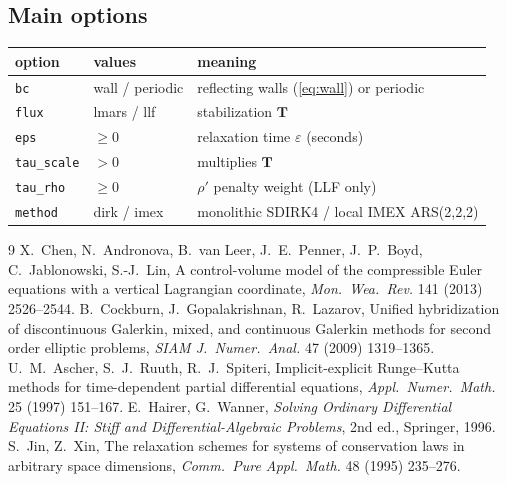 \documentclass[11pt,a4paper]{article}
\begin{document}
\subsection{Main options}
\begin{tabular}{lll}\toprule
option & values & meaning\\\midrule
\texttt{bc} & wall / periodic & reflecting walls (\eqref{eq:wall}) or periodic\\
\texttt{flux} & lmars / llf & stabilization $\bm T$\\
\texttt{eps} & $\ge 0$ & relaxation time $\varepsilon$ (seconds)\\
\texttt{tau\_scale} & $>0$ & multiplies $\bm T$\\
\texttt{tau\_rho} & $\ge0$ & $\rho'$ penalty weight (LLF only)\\
\texttt{method} & dirk / imex & monolithic SDIRK4 / local IMEX ARS(2,2,2)\\\bottomrule
\end{tabular}

\begin{thebibliography}{9}
 X.~Chen, N.~Andronova, B.~van Leer, J.~E.~Penner, J.~P.~Boyd, C.~Jablonowski,
S.-J.~Lin, A control-volume model of the compressible Euler equations with a vertical Lagrangian
coordinate, \emph{Mon.\ Wea.\ Rev.} 141 (2013) 2526--2544.
 B.~Cockburn, J.~Gopalakrishnan, R.~Lazarov, Unified hybridization of
discontinuous Galerkin, mixed, and continuous Galerkin methods for second order elliptic
problems, \emph{SIAM J.\ Numer.\ Anal.} 47 (2009) 1319--1365.
 U.~M.~Ascher, S.~J.~Ruuth, R.~J.~Spiteri, Implicit-explicit Runge--Kutta methods for
time-dependent partial differential equations, \emph{Appl.\ Numer.\ Math.} 25 (1997) 151--167.
 E.~Hairer, G.~Wanner, \emph{Solving Ordinary Differential Equations II: Stiff and
Differential-Algebraic Problems}, 2nd ed., Springer, 1996.
 S.~Jin, Z.~Xin, The relaxation schemes for systems of conservation laws in
arbitrary space dimensions, \emph{Comm.\ Pure Appl.\ Math.} 48 (1995) 235--276.
\end{thebibliography}
\end{document}
